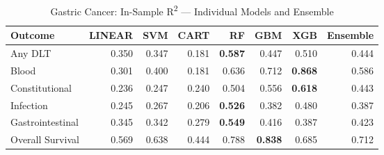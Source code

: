\begin{table}[ht]
\centering
\caption{Gastric Cancer: In-Sample R\textsuperscript{2} — Individual Models and Ensemble}
\begin{tabular}{lrrrrrrr}
\toprule
Outcome & LINEAR & SVM & CART & RF & GBM & XGB & Ensemble \\
\midrule
Any DLT & 0.350 & 0.347 & 0.181 & \textbf{0.587} & 0.447 & 0.510 & 0.444 \\
Blood & 0.301 & 0.400 & 0.181 & 0.636 & 0.712 & \textbf{0.868} & 0.586 \\
Constitutional & 0.236 & 0.247 & 0.240 & 0.504 & 0.556 & \textbf{0.618} & 0.443 \\
Infection & 0.245 & 0.267 & 0.206 & \textbf{0.526} & 0.382 & 0.480 & 0.387 \\
Gastrointestinal & 0.345 & 0.342 & 0.279 & \textbf{0.549} & 0.416 & 0.387 & 0.423 \\
Overall Survival & 0.569 & 0.638 & 0.444 & 0.788 & \textbf{0.838} & 0.685 & 0.712 \\
\bottomrule
\end{tabular}
\end{table}